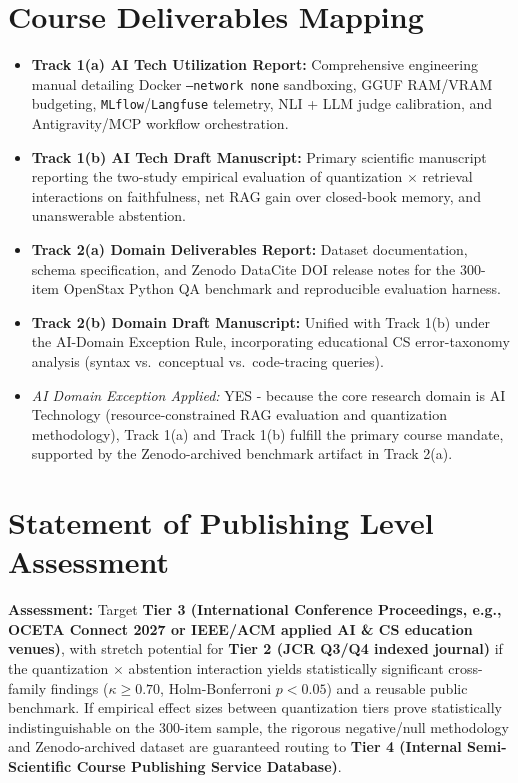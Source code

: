 \documentclass[10pt,a4paper]{article}
\begin{document}
\section{Course Deliverables Mapping}
\begin{itemize}
    \item \textbf{Track 1(a) AI Tech Utilization Report:} Comprehensive engineering manual detailing Docker \texttt{--network none} sandboxing, GGUF RAM/VRAM budgeting, \texttt{MLflow}/\texttt{Langfuse} telemetry, NLI + LLM judge calibration, and Antigravity/MCP workflow orchestration.
    \item \textbf{Track 1(b) AI Tech Draft Manuscript:} Primary scientific manuscript reporting the two-study empirical evaluation of quantization $\times$ retrieval interactions on faithfulness, net RAG gain over closed-book memory, and unanswerable abstention.
    \item \textbf{Track 2(a) Domain Deliverables Report:} Dataset documentation, schema specification, and Zenodo DataCite DOI release notes for the 300-item OpenStax Python QA benchmark and reproducible evaluation harness.
    \item \textbf{Track 2(b) Domain Draft Manuscript:} Unified with Track 1(b) under the AI-Domain Exception Rule, incorporating educational CS error-taxonomy analysis (syntax vs.\ conceptual vs.\ code-tracing queries).
    \item \textit{AI Domain Exception Applied:} YES - because the core research domain is AI Technology (resource-constrained RAG evaluation and quantization methodology), Track 1(a) and Track 1(b) fulfill the primary course mandate, supported by the Zenodo-archived benchmark artifact in Track 2(a).
\end{itemize}

\section{Statement of Publishing Level Assessment}
\textbf{Assessment:} Target \textbf{Tier 3 (International Conference Proceedings, e.g., OCETA Connect 2027 or IEEE/ACM applied AI \& CS education venues)}, with stretch potential for \textbf{Tier 2 (JCR Q3/Q4 indexed journal)} if the quantization $\times$ abstention interaction yields statistically significant cross-family findings ($\kappa \ge 0.70$, Holm-Bonferroni $p < 0.05$) and a reusable public benchmark. If empirical effect sizes between quantization tiers prove statistically indistinguishable on the 300-item sample, the rigorous negative/null methodology and Zenodo-archived dataset are guaranteed routing to \textbf{Tier 4 (Internal Semi-Scientific Course Publishing Service Database)}.
\end{document}
